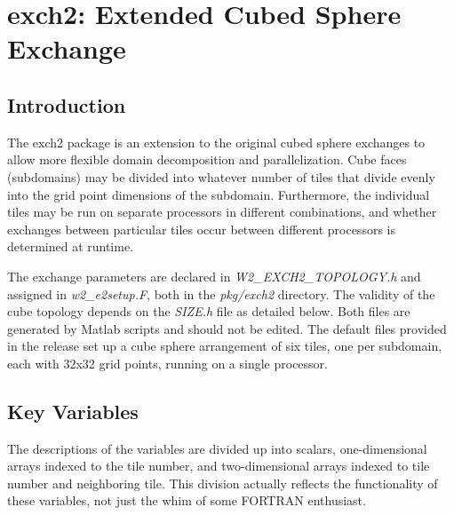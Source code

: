 


\section{exch2: Extended Cubed Sphere Exchange}
\label{sec:exch2}


\subsection{Introduction}

The exch2 package is an extension to the original cubed sphere exchanges
to allow more flexible domain decomposition and parallelization.  Cube faces
(subdomains) may be divided into whatever number of tiles that divide evenly
into the grid point dimensions of the subdomain.  Furthermore, the individual
tiles may be run on separate processors in different combinations,
and whether exchanges between particular tiles occur between different
processors is determined at runtime.

The exchange parameters are declared in {\em W2\_EXCH2\_TOPOLOGY.h} and 
assigned in {\em w2\_e2setup.F}, both in the 
{\em pkg/exch2} directory.  The validity of the cube topology depends
on the {\em SIZE.h} file as detailed below.  Both files are generated by 
Matlab scripts and
should not be edited.  The default files provided in the release set up
a cube sphere arrangement of six tiles, one per subdomain, each with 32x32 grid
points, running on a single processor.  

\subsection{Key Variables}

The descriptions of the variables are divided up into scalars,
one-dimensional arrays indexed to the tile number, and two-dimensional
arrays indexed to tile number and neighboring tile.  This division
actually reflects  the functionality of these variables, not just the
whim of some FORTRAN enthusiast.

